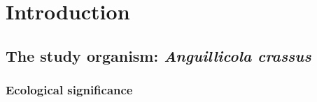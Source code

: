 

\chapter{Introduction}

\ifpdf
    \graphicspath{{1_introduction/figures/PNG/}{1_introduction/figures/PDF/}{1_introduction/figures/}}
\else
    \graphicspath{{1_introduction/figures/EPS/}{1_introduction/figures/}}
\fi







\section{The study organism: \textit{Anguillicola crassus}} 

\subsection{Ecological significance} 

